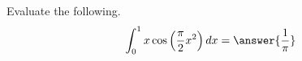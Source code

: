 \documentclass{ximera}
\author{Nela Lakos \and Kyle Parsons}
\begin{document}
\begin{exercise}

Evaluate the following.
\[
\int_0^1 x\cos\left(\frac{\pi}{2}x^2\right) dx = \answer{\frac{1}{\pi}}
\]

\end{exercise}
\end{document}
